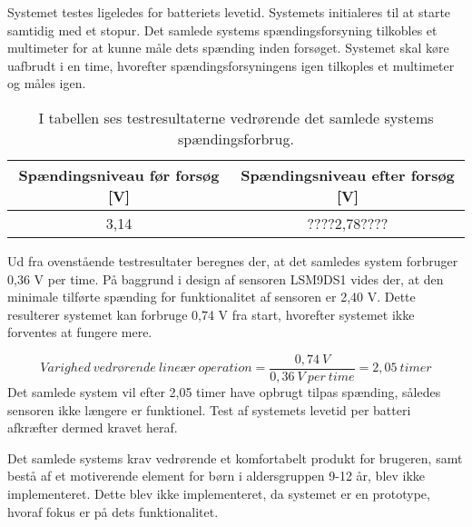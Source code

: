 Systemet testes ligeledes for batteriets levetid. %
Systemets initialeres til at starte samtidig med et stopur. Det samlede systems spændingsforsyning tilkobles et multimeter for at kunne måle dets spænding inden forsøget. Systemet skal køre uafbrudt i en time, hvorefter spændingsforsyningens igen tilkoples et multimeter og måles igen. 
\begin{table}[H]
	\centering
	\begin{tabular}{cc}
		\hline
		\rowcolor[HTML]{C0C0C0} 
		Spændingsniveau før forsøg {[}V{]} & Spændingsniveau efter forsøg {[}V{]} \\ \hline
		3,14 & ????2,78???? \\ \hline
	\end{tabular}
	\caption{I tabellen ses testresultaterne vedrørende det samlede systems spændingsforbrug.}
	\label{tab:test_spaending}
\end{table} \vspace{-.5cm}
Ud fra ovenstående testresultater beregnes der, at det samledes system forbruger 0,36 V per time. På baggrund i design af sensoren LSM9DS1 vides der, at den minimale tilførte spænding for funktionalitet af sensoren er 2,40 V. Dette resulterer systemet kan forbruge 0,74 V fra start, hvorefter systemet ikke forventes at fungere mere. 

\begin{equation}
Varighed~vedr\text{ø}rende~line\text{æ}r~operation = \frac{0,74~V}{0,36~V~per~time} = 2,05~timer
\end{equation}   
Det samlede system vil efter 2,05 timer have opbrugt tilpas spænding, således sensoren ikke længere er funktionel. %
Test af systemets levetid per batteri afkræfter dermed kravet heraf.

Det samlede systems krav vedrørende et komfortabelt produkt for brugeren, samt bestå af et motiverende element for børn i aldersgruppen 9-12 år, blev ikke implementeret. Dette blev ikke implementeret, da systemet er en prototype, hvoraf fokus er på dets funktionalitet. 